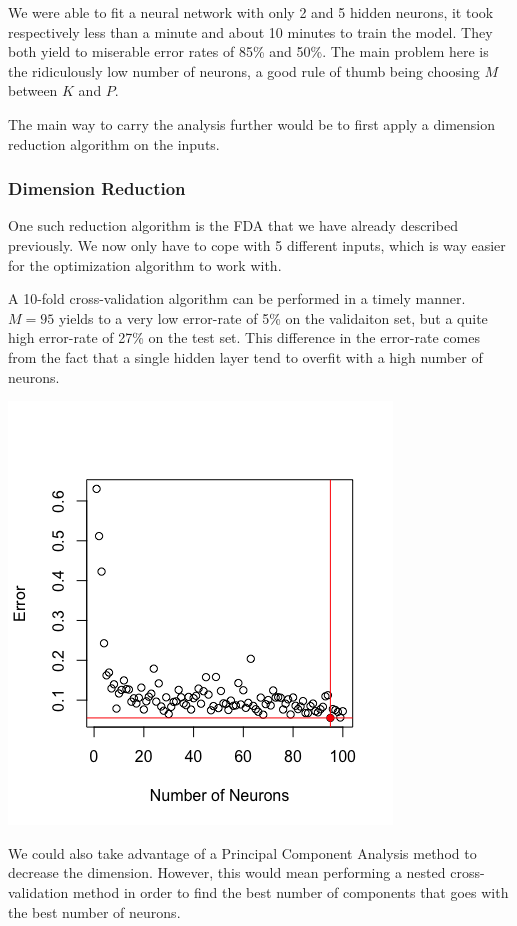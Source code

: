\documentclass[]{report}
\begin{document}
 We were able to fit a neural network with only 2 and 5 hidden neurons, it took respectively less than a minute and about 10 minutes to train the model. They both yield to miserable error rates of 85\% and 50\%. The main problem here is the ridiculously low number of neurons, a good rule of thumb being choosing $M$ between $K$ and $P$.
 
The main way to carry the analysis further would be to first apply a dimension reduction algorithm on the inputs.

\subsubsection{Dimension Reduction}
One such reduction algorithm is the FDA that we have already described previously. We now only have to cope with 5 different inputs, which is way easier for the optimization algorithm to work with. 

A 10-fold cross-validation algorithm can be performed in a timely manner. $M = 95$ yields to a very low error-rate of 5\% on the validaiton set, but a quite high error-rate of 27\% on the test set. This difference in the error-rate comes from the fact that a single hidden layer tend to overfit with a high number of neurons.

\begin{center}
	\includegraphics[width=0.6\linewidth]{Figures/nnet_fda_cv.png}
	\label{fig:nnet_fda_cv}
\end{center}

We could also take advantage of a Principal Component Analysis method to decrease the dimension. However, this would mean performing a nested cross-validation method in order to find the best number of components that goes with the best number of neurons.
\end{document}
